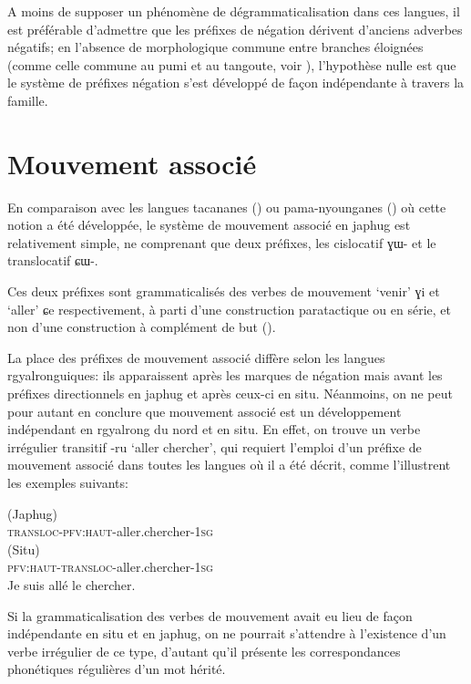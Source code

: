 \documentclass[oldfontcommands,oneside,a4paper,11pt]{article}
\newcommand{\ipa}[1]{{\phon \mbox{#1}}} %
\begin{document}
A moins de supposer un phénomène de dégrammaticalisation dans ces langues, il est préférable d'admettre que les préfixes de négation dérivent d'anciens adverbes négatifs; en l'absence de morphologique  commune entre branches éloignées (comme celle commune au pumi et au tangoute, voir \citealt{jacques11tangut.verb}), l'hypothèse nulle est que le système de préfixes négation s'est développé de façon indépendante à travers la famille.

\section{Mouvement associé} 
En comparaison avec les langues tacananes (\citealt{guillaume09mouv.assoc}) ou pama-nyounganes (\citealt{koch84associated.motion}) où cette notion a été développée, le système de mouvement associé en japhug est relativement simple, ne comprenant que deux préfixes, les cislocatif \ipa{ɣɯ-} et le translocatif \ipa{ɕɯ-}.

Ces deux préfixes sont grammaticalisés des verbes de mouvement `venir' \ipa{ɣi} et `aller' \ipa{ɕe} respectivement, à parti d'une construction paratactique ou en série, et non d'une construction à complément de but (\citealt{jacques13harmonization}).

La place des préfixes de mouvement associé diffère selon les langues rgyalronguiques: ils apparaissent après les marques de négation mais avant les préfixes directionnels en japhug et après ceux-ci en situ. Néanmoins, on ne peut pour autant en conclure que  mouvement associé est un développement indépendant en rgyalrong du nord et en situ. En effet, on trouve un verbe irrégulier transitif \ipa{-ru} `aller chercher', qui requiert l'emploi d'un préfixe de mouvement associé dans toutes les langues où il a été décrit, comme l'illustrent les exemples suivants:

\begin{exe}
 \ex  
 \gll  \ipa{\textbf{ɕ}-tɤ-ru-t-a}  (Japhug) \\
 \textsc{transloc-pfv:haut}-aller.chercher-\textsc{1sg} \\
\ex  
 \gll  \ipa{rə-\textbf{ɕɐ}-rô-ŋ}  (Situ) \\
 \textsc{pfv:haut-transloc}-aller.chercher-\textsc{1sg} \\
\glt Je suis allé le chercher.
\end{exe}
 Si la grammaticalisation des verbes de mouvement avait eu lieu de façon indépendante en situ et en japhug, on ne pourrait s'attendre à l'existence d'un verbe irrégulier de ce type, d'autant qu'il présente les correspondances phonétiques régulières d'un mot hérité.
\end{document}
